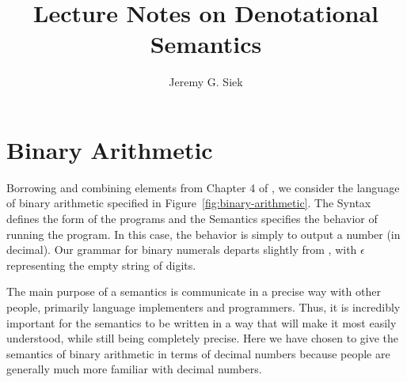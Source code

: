 \documentclass{tufte-handout}
\title{Lecture Notes on Denotational Semantics}
\author{Jeremy G. Siek}
\begin{document}
\maketitle

\tableofcontents

\clearpage


\section{Binary Arithmetic}


Borrowing and combining elements from Chapter 4 of
\citet{Schmidt:1986vn}, we consider the language of binary arithmetic
specified in Figure~\ref{fig:binary-arithmetic}.  The Syntax defines
the form of the programs and the Semantics specifies the behavior of
running the program. In this case, the behavior is simply to output a
number (in decimal).  Our grammar for binary numerals departs slightly
from \citet{Schmidt:1986vn}, with $\epsilon$ representing the empty
string of digits.

The main purpose of a semantics is communicate in a precise way with
other people, primarily language implementers and programmers.  Thus,
it is incredibly important for the semantics to be written in a way
that will make it most easily understood, while still being completely
precise.  Here we have chosen to give the semantics of binary
arithmetic in terms of decimal numbers because people are generally
much more familiar with decimal numbers. 
\end{document}
